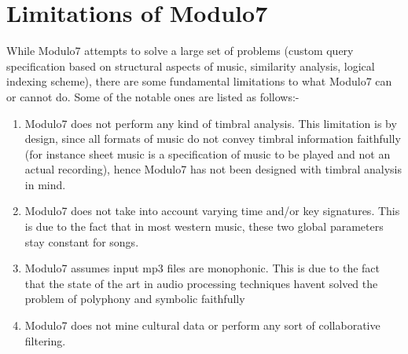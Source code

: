 \section{Limitations of Modulo7}

While Modulo7 attempts to solve a large set of problems (custom query specification based on structural aspects of music, similarity analysis, logical indexing scheme), there are some fundamental limitations to what Modulo7 can or cannot do. Some of the notable ones are listed as follows:-

\begin{enumerate}
\item Modulo7 does not perform any kind of timbral analysis. This limitation is by design, since all formats of music do not convey timbral information faithfully (for instance sheet music is a specification of music to be played and not an actual recording), hence Modulo7 has not been designed with timbral analysis in mind.
\item Modulo7 does not take into account varying time and/or key signatures. This is due to the fact that in most western music, these two global parameters stay constant for songs.
\item Modulo7 assumes input mp3 files are monophonic. This is due to the fact that the state of the art in audio processing techniques havent solved the problem of polyphony and symbolic faithfully  \cite{melextract}
\item Modulo7 does not mine cultural data or perform any sort of collaborative filtering.  
\end{enumerate}
